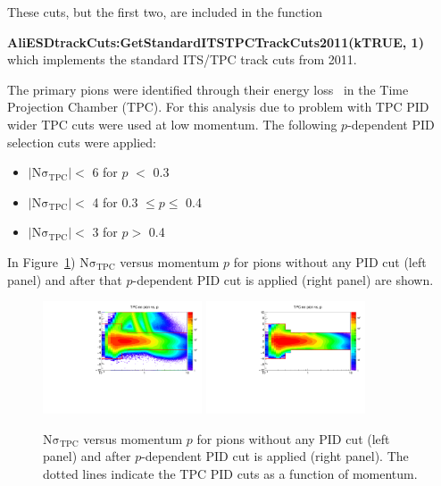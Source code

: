 These cuts, but the first two, are included in the function 
 
\textbf{AliESDtrackCuts:GetStandardITSTPCTrackCuts2011(kTRUE, 1)} which implements the standard ITS/TPC track cuts from 2011.

The primary pions were identified through their energy loss \dedx~in the Time Projection Chamber (TPC). For this analysis due to problem with TPC PID  wider TPC cuts were used at low momentum. The following  $p$-dependent PID selection cuts were applied: 


\begin{itemize}
\item $\left | \mathrm{N\sigma}_{\mathrm{TPC}} \right | < $ 6 for $p$ $<$ 0.3 \gmom
\item $\left | \mathrm{N\sigma}_{\mathrm{TPC}} \right | < $ 4 for 0.3 $\leq p \leq$ 0.4~\gmom
\item $\left | \mathrm{N\sigma}_{\mathrm{TPC}} \right | < $ 3 for $p >$ 0.4~\gmom
\end{itemize}
 
In \mbox{Figure \ref{Fig:chap5-5.3}}) $\mathrm{N\sigma}_{\mathrm{TPC}}$ versus momentum $p$ for pions without any PID cut (left panel) and after that $p$-dependent PID cut is applied (right panel) are shown.

\begin{figure}[h]
\centering
\includegraphics[width= 0.42\textwidth]{Images/Chapter5/pion_TPC.pdf}
\includegraphics[width= 0.42\textwidth]{Images/Chapter5/pion_TPC_cut.pdf}
\caption{$\mathrm{N\sigma}_{\mathrm{TPC}}$ versus momentum $p$ for pions without any PID cut (left panel) and after $p$-dependent PID cut is applied (right panel). The dotted lines indicate the TPC PID cuts as a function of momentum.}
\label{Fig:chap5-5.3} 
\end{figure}
 

